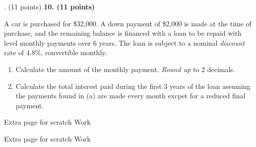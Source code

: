 \documentclass[12pt]{article}
\makeatletter
\newenvironment{problem}[1][]{%
  \bigskip%
  \noindent\begin{boxedminipage}{\columnwidth}%
  \def\@tempa{#1}%
  \ifx\@tempa\empty\else%
    \textbf{#1}\hspace{0.5em}%
  \fi%
}{%
  \end{boxedminipage}%
}
\makeatother
\begin{document}
\newpage



\begin{problem}[10. (11 points)]
A car is purchased for \$32{,}000. A down payment of \$2{,}000 is made at the time of
purchase, and the remaining balance is financed with a loan to be repaid with level
monthly payments over 6 years. The loan is subject to a nominal \textit{discount} rate
of $4.8\%$, convertible monthly.

\begin{enumerate}
    \item[(a)] Calculate the amount of the monthly payment. \textit{Round up} to 2 decimals.
    \item[(b)] Calculate the total interest paid during the first 3 years of the loan assuming the payments found in (a) are made every month excpet for a reduced final payment.
\end{enumerate}
\end{problem}











\newpage
Extra page for scratch Work

\newpage
Extra page for scratch Work
\end{document}
